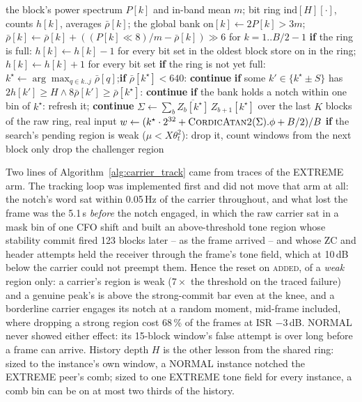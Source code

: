 \begin{algorithm}[htbp]
\caption{Streaming carrier finder (\texttt{rx\_stream.c} \texttt{carrier\_track}), once per detection block.}
\label{alg:carrier_track}
\begin{algorithmic}[1]
\Require the block's power spectrum $P[k]$ and in-band mean $m$; bit ring $\mathrm{ind}[H][\cdot]$, counts $h[k]$, averages $\bar\rho[k]$; the global bank
\State $\mathrm{on}[k] \gets 2P[k] > 3m$;\quad $\bar\rho[k] \gets \bar\rho[k] + ((P[k] \ll 8)/m - \bar\rho[k]) \gg 6$ for $k = 1 .. B/2 - 1$
\State \textbf{if} the ring is full: $h[k] \gets h[k] - 1$ for every bit set in the oldest block
\State store $\mathrm{on}$ in the ring;\quad $h[k] \gets h[k] + 1$ for every bit set 
\State \textbf{if} the ring is not yet full: \Return
{}
    \State $k^\star \gets \arg\max_{q \in k..j} \bar\rho[q]$;\quad \textbf{if} $\bar\rho[k^\star] < 640$: \textbf{continue} 
    \State \textbf{if} some $k' \in \{k^\star \pm S\}$ has $2h[k'] \ge H \wedge 8 \bar\rho[k'] \ge \bar\rho[k^\star]$: \textbf{continue} 
    \State \textbf{if} the bank holds a notch within one bin of $k^\star$: refresh it; \textbf{continue} 
    \State $\Sigma \gets \sum_{b} \overline{Z_b[k^\star]}\, Z_{b+1}[k^\star]$ over the last $K$ blocks of the raw ring, real input 
    \State $w \gets (k^\star \cdot 2^{32} + \textsc{CordicAtan2}(\Sigma).\phi + B/2) / B$
        \State \textbf{if} the search's pending region is weak ($\mu < X\theta_t^2$): drop it, count windows from the next block only
        \State drop the challenger region
    \EndIf
\EndFor
\end{algorithmic}
\end{algorithm}

Two lines of Algorithm~\ref{alg:carrier_track} came from traces of
the EXTREME arm.  The tracking loop was implemented first and did
not move that arm at all: the notch's word sat within 0.05\,Hz of the
carrier throughout, and what lost the frame was the 5.1\,s
\emph{before} the notch engaged, in which the raw carrier sat in a
mask bin of one CFO shift and built an above-threshold tone region
whose stability commit fired 123 blocks later -- as the frame arrived
-- and whose ZC and header attempts held the receiver through the
frame's tone field, which at 10\,dB below the carrier could not
preempt them.  Hence the reset on \textsc{added}, of a \emph{weak}
region only: a carrier's region is weak ($7\times$ the threshold on
the traced failure) and a genuine peak's is above the strong-commit
bar even at the knee, and a borderline carrier engages its notch at a
random moment, mid-frame included, where dropping a strong region
cost 68\,\% of the frames at ISR $-3$\,dB.  NORMAL never showed
either effect: its 15-block window's false attempt is over long before
a frame can arrive.  History depth $H$ is the other lesson from the
shared ring: sized to the instance's own window, a NORMAL instance
notched the EXTREME peer's comb; sized to one EXTREME tone field for
every instance, a comb bin can be on at most two thirds of the history.

